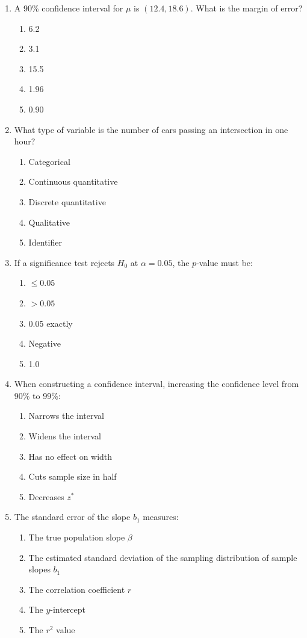 \begin{enumerate}[resume, leftmargin=1.5em]
  \item A 90\% confidence interval for $\mu$ is $(12.4, 18.6)$. What is the margin of error?
  \begin{enumerate}[label=(\Alph*)]
    \item 6.2 \item 3.1 \item 15.5 \item 1.96 \item 0.90
  \end{enumerate}

  \item What type of variable is the number of cars passing an intersection in one hour?
  \begin{enumerate}[label=(\Alph*)]
    \item Categorical \item Continuous quantitative \item Discrete quantitative \item Qualitative \item Identifier
  \end{enumerate}

  \item If a significance test rejects $H_0$ at $\alpha = 0.05$, the $p$-value must be:
  \begin{enumerate}[label=(\Alph*)]
    \item $\le 0.05$ \item $> 0.05$ \item 0.05 exactly \item Negative \item 1.0
  \end{enumerate}

  \item When constructing a confidence interval, increasing the confidence level from 90\% to 99\%:
  \begin{enumerate}[label=(\Alph*)]
    \item Narrows the interval \item Widens the interval \item Has no effect on width \item Cuts sample size in half \item Decreases $z^*$
  \end{enumerate}

  \item The standard error of the slope $b_1$ measures:
  \begin{enumerate}[label=(\Alph*)]
    \item The true population slope $\beta$
    \item The estimated standard deviation of the sampling distribution of sample slopes $b_1$
    \item The correlation coefficient $r$
    \item The $y$-intercept
    \item The $r^2$ value
  \end{enumerate}
\end{enumerate}

